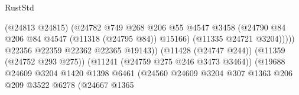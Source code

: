 \begin{lexlean}{RustStd}
\begin{coremodule}
{{{{{{{{{{{{{{{{{{{                                                          (@24813 @24815)
                                                          (@24782
                                                            @749
                                                            @268
                                                            @206
                                                            @55
                                                            @4547
                                                            @3458
                                                            (@24790
                                                              @84
                                                              @206
                                                              @84
                                                              @4547
                                                              (@11318 (@24795 @84))
                                                              @15166)
                                                            (@11335 @24721 @3204)))))
                                                    @22356
                                                    @22359
                                                    @22362
                                                    @22365
                                                    @19143))
                                                (@11428 (@24747 @244))
                                                (@11359 (@24752 @293 @275))
                                                (@11241 (@24759 @275 @246 @3473 @3464))
                                                (@19688
                                                  @24609
                                                  @3204
                                                  @1420
                                                  @1398
                                                  @6461
                                                  (@24560
                                                    @24609
                                                    @3204
                                                    @307
                                                    @1363
                                                    @206
                                                    @209
                                                    @3522
                                                    @6278
                                                    (@24667
                                                      @1365
}}}}}}}}}}}}}}}}}}}
\end{coremodule}
\end{lexlean}
